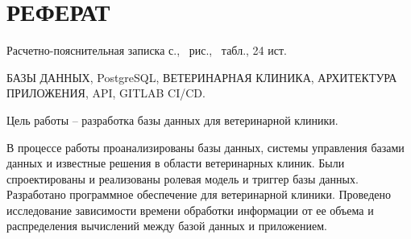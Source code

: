 \section*{РЕФЕРАТ}
\setcounter{page}{3}

Расчетно-пояснительная записка \pageref{LastPage} с., \totalfigures\ рис., \totaltables\ табл., 24 ист.

БАЗЫ ДАННЫХ, PostgreSQL, ВЕТЕРИНАРНАЯ КЛИНИКА, АРХИТЕКТУРА ПРИЛОЖЕНИЯ, API, GITLAB CI/CD.

Цель работы --  разработка базы данных для ветеринарной клиники.

В процессе работы проанализированы базы данных, системы управления базами данных и известные решения в области ветеринарных клиник. Были спроектированы и реализованы ролевая модель и триггер базы данных. Разработано программное обеспечение для ветеринарной клиники. Проведено исследование зависимости времени обработки информации от ее объема и распределения вычислений между базой данных и приложением. 

\pagebreak
